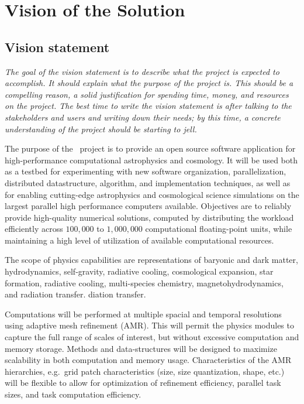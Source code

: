\documentclass{article}
\begin{document}
\section{Vision of the Solution}

\subsection{Vision statement}

    \textit{The goal of the vision statement is to describe what the project
    is expected to accomplish. It should explain what the purpose of
    the project is. This should be a compelling reason, a solid
    justification for spending time, money, and resources on the
    project. The best time to write the vision statement is after
    talking to the stakeholders and users and writing down their
    needs; by this time, a concrete understanding of the project
    should be starting to jell.}

The purpose of the \cello\ project is to provide an open source
software application for high-performance computational astrophysics
and cosmology.  It will be used both as a testbed for experimenting
with new software organization, parallelization, distributed
datastructure, algorithm, and implementation techniques, as well as
for enabling cutting-edge astrophysics and cosmological science
simulations on the largest parallel high performance computers
available.  Objectives are to reliably provide high-quality numerical
solutions, computed by distributing the workload efficiently across
$100,000$ to $1,000,000$ computational floating-point units, while
maintaining a high level of utilization of available computational
resources.

The scope of physics capabilities are representations of baryonic and
dark matter, hydrodynamics, self-gravity, radiative cooling,
cosmological expansion, star formation, radiative cooling,
multi-species chemistry, magnetohydrodynamics, and radiation transfer.
diation transfer.

  Computations will be performed at multiple spacial
   and temporal resolutions using adaptive mesh refinement (AMR).
   This will permit the physics modules to capture the full range of
   scales of interest, but without excessive computation and memory
   storage.  Methods and data-structures will be designed to maximize
   scalability in both computation and memory usage.  Characteristics
   of the AMR hierarchies, e.g.~grid patch characteristics (size, size
   quantization, shape, etc.) will be flexible to allow for
   optimization of refinement efficiency, parallel task sizes, and
   task computation efficiency.
\end{document}
